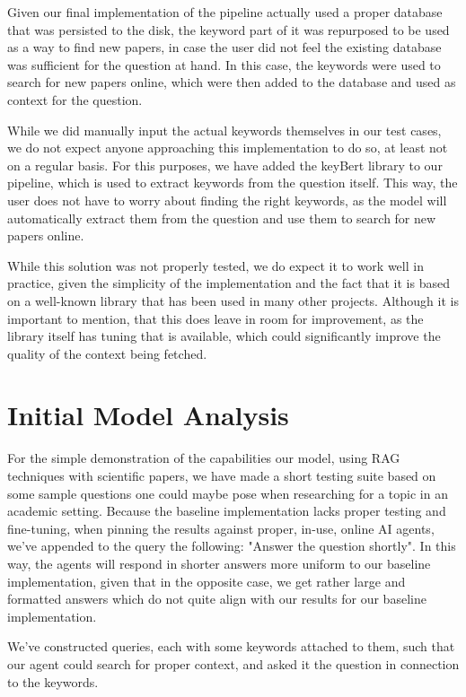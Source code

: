 \documentclass[fleqn,moreauthors,10pt]{ds_report}
\begin{document}
Given our final implementation of the pipeline actually used a proper database that was persisted to the disk, the keyword part of it was repurposed to be used as a way to find new papers, in case the user did not feel the existing database was sufficient for the question at hand. In this case, the keywords were used to search for new papers online, which were then added to the database and used as context for the question.

While we did manually input the actual keywords themselves in our test cases, we do not expect anyone approaching this implementation to do so, at least not on a regular basis. For this purposes, we have added the keyBert \cite{grootendorst2020keybert} library to our pipeline, which is used to extract keywords from the question itself. This way, the user does not have to worry about finding the right keywords, as the model will automatically extract them from the question and use them to search for new papers online.

While this solution was not properly tested, we do expect it to work well in practice, given the simplicity of the implementation and the fact that it is based on a well-known library that has been used in many other projects. Although it is important to mention, that this does leave in room for improvement, as the library itself has tuning that is available, which could significantly improve the quality of the context being fetched.

\section*{Initial Model Analysis}
For the simple demonstration of the capabilities our model, using RAG techniques with scientific papers, we have made a short testing suite based on some sample questions one could maybe pose when researching for a topic in an academic setting. Because the baseline implementation lacks proper testing and fine-tuning, when pinning the results against proper, in-use, online AI agents, we've appended to the query the following: "Answer the question shortly". In this way, the agents will respond in shorter answers more uniform to our baseline implementation, given that in the opposite case, we get rather large and formatted answers which do not quite align with our results for our baseline implementation.

We've constructed queries, each with some keywords attached to them, such that our agent could search for proper context, and asked it the question in connection to the keywords.
\end{document}
